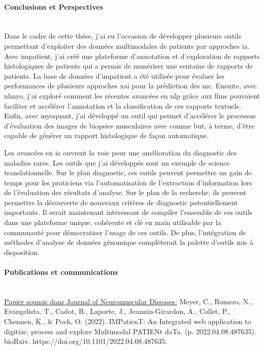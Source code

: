 \paragraph{\textbf{Conclusions et Perspectives}}\mbox{}\\

Dans le cadre de cette thèse, j’ai eu l’occasion de développer plusieurs outils permettant d’exploiter des données multimodales de patients par approches \gls{ia}. Avec \gls{impatient}, j’ai créé une plateforme d’annotation et d’exploration de rapports histologiques de patients qui a permis de numériser une centaine de rapports de patients. La base de données d'\gls{impatient} a été utilisée pour évaluer les performances de plusieurs approches \gls{xai} pour la prédiction des \gls{mc}. Ensuite, avec \gls{nlmyo}, j’ai exploré comment les récentes avancées en \gls{nlp} grâce aux \gls{llms} pouvaient faciliter et accélérer l’annotation et la classification de ces rapports textuels. Enfin, avec \gls{myoquant}, j’ai développé un outil qui permet d’accélérer le processus d’évaluation des images de biopsies musculaires avec comme but, à terme, d’être capable de générer un rapport histologique de façon automatique.

Les avancées en \gls{ia} ouvrent la voie pour une amélioration du diagnostic des maladies rares. Les outils que j’ai développés sont un exemple de science translationnelle. Sur le plan diagnostic, ces outils peuvent permettre un gain de temps pour les praticiens via l’automatisation de l’extraction d’information lors de l’évaluation des résultats d’analyse. Sur le plan de la recherche, ils peuvent permettre la découverte de nouveaux critères de diagnostic potentiellement importants. Il serait maintenant intéressant de compiler l’ensemble de ces outils dans une plateforme unique, cohérente et clé en main utilisable par la communauté pour démocratiser l’usage de ces outils. De plus, l’intégration de méthodes d’analyse de données génomique complèterait la palette d’outils mis à disposition.

\paragraph{\textbf{Publications et communications}}\mbox{}\\

\underline{Papier soumis dans Journal of Neuromuscular Diseases:} Meyer, C., Romero, N., Evangelista, T., Cadot, B., Laporte, J., Jeannin-Girardon, A., Collet, P., Chennen, K., \& Poch, O. (2022). IMPatienT: An Integrated web application to digitize, process and explore Multimodal PATIENt daTa. (p. 2022.04.08.487635). bioRxiv. https://doi.org/10.1101/2022.04.08.487635. 

